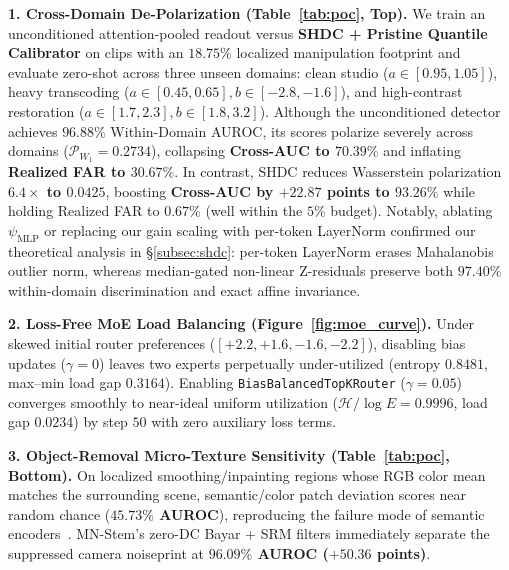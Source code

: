\documentclass[10pt,twocolumn]{article}
\begin{document}
\noindent\textbf{1. Cross-Domain De-Polarization (Table~\ref{tab:poc}, Top).} We train an unconditioned attention-pooled readout versus \textbf{SHDC + Pristine Quantile Calibrator} on clips with an $18.75\%$ localized manipulation footprint and evaluate zero-shot across three unseen domains: clean studio ($a\in[0.95,1.05]$), heavy transcoding ($a\in[0.45,0.65], b\in[-2.8,-1.6]$), and high-contrast restoration ($a\in[1.7,2.3], b\in[1.8,3.2]$). Although the unconditioned detector achieves $96.88\%$ Within-Domain AUROC, its scores polarize severely across domains ($\mathcal{P}_{W_1}=0.2734$), collapsing \textbf{Cross-AUC to $70.39\%$} and inflating \textbf{Realized FAR to $30.67\%$}. In contrast, SHDC reduces Wasserstein polarization \textbf{$6.4\times$ to $0.0425$}, boosting \textbf{Cross-AUC by $+22.87$ points to $93.26\%$} while holding Realized FAR to \textbf{$0.67\%$} (well within the $5\%$ budget). Notably, ablating $\psi_{\text{MLP}}$ or replacing our gain scaling with per-token LayerNorm confirmed our theoretical analysis in \S\ref{subsec:shdc}: per-token LayerNorm erases Mahalanobis outlier norm, whereas median-gated non-linear Z-residuals preserve both $97.40\%$ within-domain discrimination and exact affine invariance.

\noindent\textbf{2. Loss-Free MoE Load Balancing (Figure~\ref{fig:moe_curve}).} Under skewed initial router preferences ($[+2.2,+1.6,-1.6,-2.2]$), disabling bias updates ($\gamma=0$) leaves two experts perpetually under-utilized (entropy $0.8481$, max--min load gap $0.3164$). Enabling \texttt{BiasBalancedTopKRouter} ($\gamma=0.05$) converges smoothly to near-ideal uniform utilization (\textbf{$\mathcal{H}/\log E = 0.9996$}, load gap $0.0234$) by step $50$ with zero auxiliary loss terms.

\noindent\textbf{3. Object-Removal Micro-Texture Sensitivity (Table~\ref{tab:poc}, Bottom).} On localized smoothing/inpainting regions whose RGB color mean matches the surrounding scene, semantic/color patch deviation scores near random chance (\textbf{$45.73\%$ AUROC}), reproducing the failure mode of semantic encoders~\cite{kang2026manividlens}. MN-Stem's zero-DC Bayar + SRM filters immediately separate the suppressed camera noiseprint at \textbf{$96.09\%$ AUROC ($+50.36$ points)}.
\end{document}
